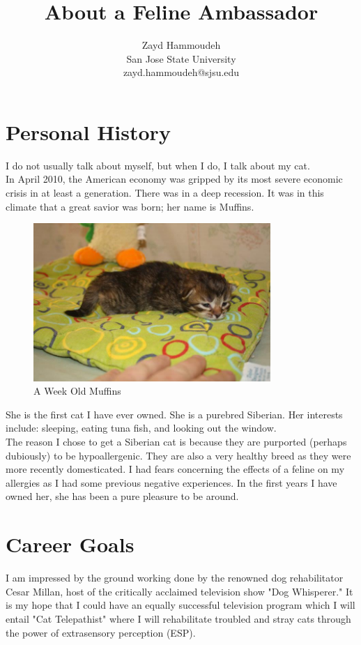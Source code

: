 \documentclass{article}
\title{About a Feline Ambassador}
\author{
	Zayd Hammoudeh \\
	San Jose State University \\
	zayd.hammoudeh@sjsu.edu
}
\begin{document}
\maketitle


\section{Personal History}
I do not usually talk about myself, but when I do, I talk about my cat.\\

In April 2010, the American economy was gripped by its most severe economic crisis in at least a generation.  There was in a deep recession.  It was in this climate that a great savior was born; her name is Muffins.  

\begin{figure}[ht!]
\centering
\includegraphics[width=90mm]{./images/muffins.jpg}
\caption{A Week Old Muffins}
\end{figure}

She is the first cat I have ever owned.  She is a purebred Siberian.  Her interests include: sleeping, eating tuna fish, and looking out the window.\\

The reason I chose to get a Siberian cat is because they are purported (perhaps dubiously) to be hypoallergenic. They are also a very healthy breed as they were more recently domesticated.  I had fears concerning the effects of a feline on my allergies as I had some previous negative experiences.  In the first years I have owned her, she has been a pure pleasure to be around.

\section{Career Goals}
I am impressed by the ground working done by the renowned dog rehabilitator Cesar Millan, host of the critically acclaimed television show "Dog Whisperer." It is my hope that I could have an equally successful television program which I will entail "Cat Telepathist"  where I will rehabilitate troubled and stray cats through the power of extrasensory perception (ESP).\\
\end{document}
